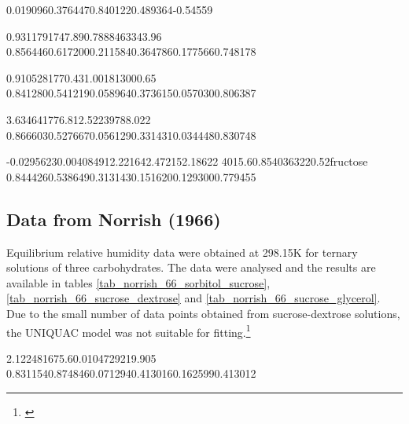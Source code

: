 %
	{0.019096}{0.376447}{0.840122}{0.489364}{-0.54559}

%
	{0.931179}{1747.89}{0.788846}{3343.96}
%
	{0.856446}{0.617200}{0.211584}{0.364786}{0.177566}{0.748178}

%
	{0.910528}{1770.43}{1.00181}{3000.65}
%
	{0.841280}{0.541219}{0.058964}{0.373615}{0.057030}{0.806387}

%
	{3.63464}{1776.81}{2.52239}{788.022}
%
	{0.866603}{0.527667}{0.056129}{0.331431}{0.034448}{0.830748}

%
	{-0.0295623}{0.00408491}{2.22164}{2.47215}{2.18622}
%
	{4015.6}{0.854036}{3220.52}{fructose}
%
	{0.844426}{0.538649}{0.313143}{0.151620}{0.129300}{0.779455}

\FloatBarrier

\subsection{Data from Norrish (1966)}

Equilibrium relative humidity data were obtained at 298.15K for ternary solutions
of three carbohydrates. The data were analysed and the results are available
in tables \ref{tab_norrish_66_sorbitol_sucrose},
\ref{tab_norrish_66_sucrose_dextrose} and \ref{tab_norrish_66_sucrose_glycerol}.
Due to the small number of data points obtained from sucrose-dextrose solutions,
the UNIQUAC model was not suitable for fitting.\footnote{\cite{norrish1966}}



%
	{2.12248}{1675.6}{0.0104729}{219.905}
%
	{0.831154}{0.874846}{0.071294}{0.413016}{0.162599}{0.413012}

